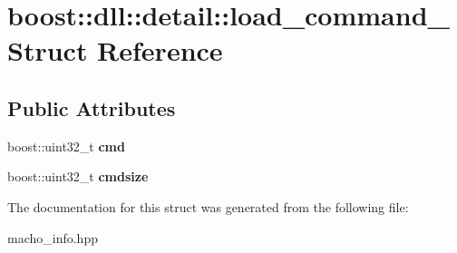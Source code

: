 \hypertarget{a00193}{}\section{boost\+:\+:dll\+:\+:detail\+:\+:load\+\_\+command\+\_\+ Struct Reference}
\label{a00193}
\subsection*{Public Attributes}
\begin{DoxyCompactItemize}
\item 
boost\+::uint32\+\_\+t {\bfseries cmd}\hypertarget{a00193_ad2d445796603c2fa9984f860d9533701}{}\label{a00193_ad2d445796603c2fa9984f860d9533701}

\item 
boost\+::uint32\+\_\+t {\bfseries cmdsize}\hypertarget{a00193_a51e8ce5c424cfe9bbd0d52eb817d23ff}{}\label{a00193_a51e8ce5c424cfe9bbd0d52eb817d23ff}

\end{DoxyCompactItemize}


The documentation for this struct was generated from the following file\+:\begin{DoxyCompactItemize}
\item 
macho\+\_\+info.\+hpp\end{DoxyCompactItemize}
